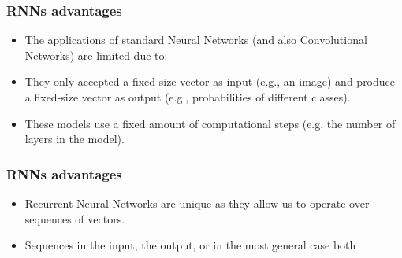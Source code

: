 


\begin{frame}[fragile] \frametitle{RNNs advantages}

\begin{itemize}
\item The applications of standard Neural Networks (and also Convolutional Networks) are limited due to:
\item They only accepted a fixed-size vector as input (e.g., an image) and produce a fixed-size vector as output (e.g., probabilities of different classes). 
\item These models use a fixed amount of computational steps (e.g. the number of layers in the model).
\end{itemize}
\end{frame}

\begin{frame}[fragile] \frametitle{RNNs advantages}

\begin{itemize}
\item Recurrent Neural Networks are unique as they allow us to operate over sequences of vectors.
\item Sequences in the input, the output, or in the most general case both
\end{itemize}
\end{frame}


